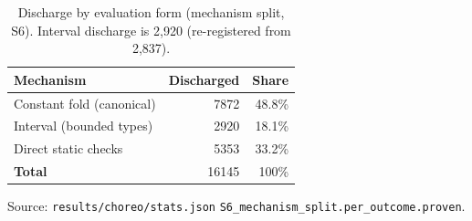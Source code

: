 \begin{table}[t]
\centering\footnotesize
\caption{Discharge by evaluation form (mechanism split, S6). Interval discharge is 2{,}920 (re-registered from 2{,}837).}
\label{tab:rq6-mechanism}
\begin{tabular}{@{}lrr@{}}
\toprule
Mechanism & Discharged & Share \\
\midrule
Constant fold (canonical) & 7872 & 48.8\% \\
Interval (bounded types) & 2920 & 18.1\% \\
Direct static checks & 5353 & 33.2\% \\
\textbf{Total} & 16145 & 100\% \\
\bottomrule
\end{tabular}
\vspace{0.4em}\begin{minipage}{0.98\linewidth}\raggedright\footnotesize Source: \texttt{results/choreo/stats.json} \texttt{S6\_mechanism\_split.per\_outcome.proven}.\end{minipage}
\end{table}
